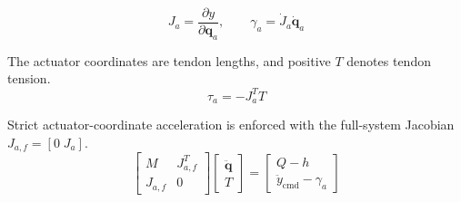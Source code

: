 \documentclass[11pt]{article}
\begin{document}
\begin{equation}
J_a=\frac{\partial y}{\partial\boldsymbol q_a},\qquad \gamma_a=\dot J_a\dot{\boldsymbol q}_a
\end{equation}

The actuator coordinates are tendon lengths, and positive $T$ denotes tendon tension.
\begin{equation}
\tau_a=-J_a^TT
\end{equation}

Strict actuator-coordinate acceleration is enforced with the full-system Jacobian $J_{a,f}=[0\;J_a]$.
\begin{equation}
\begin{bmatrix}M&J_{a,f}^{T}\\J_{a,f}&0\end{bmatrix}\begin{bmatrix}\ddot{\boldsymbol q}\\T\end{bmatrix}=\begin{bmatrix}Q-h\\\ddot y_{\mathrm{cmd}}-\gamma_a\end{bmatrix}
\end{equation}
\end{document}
